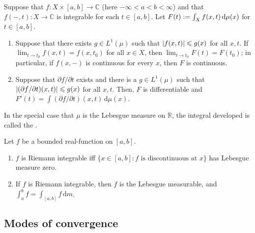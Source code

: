 \documentclass[12pt]{article}	%
\begin{document}
\begin{thm}
	Suppose that $f : X \times [a, b] \to \mathbb{C}$ (here $-\infty < a < b < \infty$) and that $f(-, t) : X \to \mathbb{C}$ is integrable for each $t \in [a, b]$. Let $F(t) \vcentcolon= \int_{X} f(x, t) \,{\mathrm d}\mu(x)$ for $t \in [a, b]$.

	\begin{enumerate}
		\item Suppose that there exists $g \in L^{1}(\mu)$ such that ${\left\lvert f(x, t) \right\lvert} \leqslant g(x)$ for all $x, t$. \newline
		If $\lim_{t \to t_{0}} f(x, t) = f(x, t_{0})$ for all $x \in X$, then $\lim_{t \to t_{0}} F(t) = F(t_{0})$; in particular, if $f(x, -)$ is continuous for every $x$, then $F$ is continuous. 
		\item Suppose that $\partial f/\partial t$ exists and there is a $g \in L^{1}(\mu)$ such that ${\left\lvert (\partial f/\partial t)(x, t) \right\lvert} \leqslant g(x)$ for all $x, t$. Then, $F$ is differentiable and $F'(t) = \int (\partial f/\partial t)(x, t) \,{\mathrm d}\mu(x)$.
	\end{enumerate}
\end{thm}

In the special case that $\mu$ is the Lebesgue measure on $\mathbb{R}$, the integral developed is called the .

\begin{thm}
	Let $f$ be a bounded real-function on $[a, b]$.
	\begin{enumerate}
		\item $f$ is Riemann integrable iff $\{x \in [a, b] : \text{$f$ is discontinuous at $x$}\}$ has Lebesgue measure zero.
		\item If $f$ is Riemann integrable, then $f$ is the Lebesgue measurable, and $\int_{a}^{b} f = \int_{[a, b]} f \,{\mathrm d}m$.
	\end{enumerate}
\end{thm}

\subsection{Modes of convergence}
\end{document}

